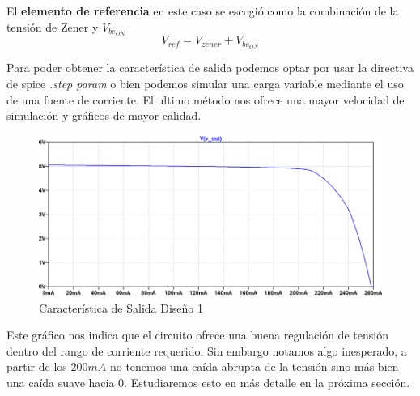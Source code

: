 El \textbf{elemento de referencia} en este caso se escogió como la combinación de la tensión de Zener y $V_{be_{ON}}$
\begin{equation}
	V_{ref} = V_{zener} + V_{be_{ON}}
\end{equation}

Para poder obtener la característica de salida podemos optar por usar la directiva de spice \textit{.step param} o bien podemos simular una carga variable mediante el uso de una fuente de corriente. El ultimo método nos ofrece una mayor velocidad de simulación y gráficos de mayor calidad.

\begin{figure}[H]
	\centering
	\includegraphics[width=0.7\linewidth]{ImagenesEjercicio1/CaracteristicaDeSalidaConGrillaFV}
	\caption{Característica de Salida Diseño 1}
	\label{fig:caracteristicadesalidacongrillafv}
\end{figure}

Este gráfico nos indica que el circuito ofrece una buena regulación de tensión dentro del rango de corriente requerido. Sin embargo notamos algo inesperado, a partir de los $200mA$ no tenemos una caída abrupta de la tensión sino más bien una caída suave hacia 0. Estudiaremos esto en más detalle en la próxima sección.

